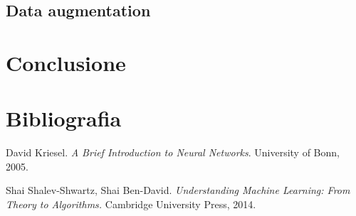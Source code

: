 \documentclass[12pt, twoside, letterpaper]{report}
\begin{document}
		\section{Data augmentation}

	\chapter*{Conclusione}	
	\chapter*{Bibliografia}
		\begin{enumerate}[label={[\arabic*]}]
			\item David Kriesel. \textit{A Brief Introduction to Neural Networks}. University of Bonn, 2005.
			\item Shai Shalev-Shwartz, Shai Ben-David. \textit{Understanding Machine Learning: From Theory to Algorithms.} Cambridge University Press, 2014.
		\end{enumerate}
	
\end{document}
